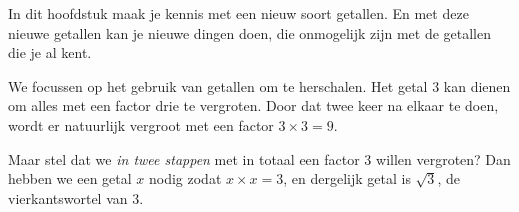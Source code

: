\documentclass{ximera}
\begin{document}
			

	In dit hoofdstuk maak je kennis met een nieuw soort getallen.
	En met deze nieuwe getallen kan je nieuwe dingen doen, die onmogelijk zijn met de getallen die je al kent.



    We focussen op het gebruik van getallen om te herschalen. Het getal $3$ kan dienen om alles met een factor drie te vergroten. Door dat twee keer na elkaar te doen, wordt er natuurlijk vergroot met een factor $3\times3=9$.

	\begin{image}[\textwidth]
\end{image}


    Maar stel dat we \textit{in twee stappen} met in totaal een factor $3$ willen vergroten? Dan hebben we een getal $x$ nodig zodat $x \times x = 3$, en dergelijk getal is $\sqrt{3}$, de vierkantswortel van $3$.
\end{document}
